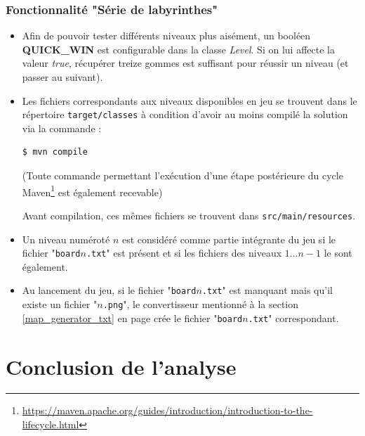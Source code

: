 \documentclass[12pt, openany]{report}
\begin{document}
\subsubsection{Fonctionnalité "Série de labyrinthes"}
\begin{itemize}
	\item Afin de pouvoir tester différents niveaux plus aisément, un booléen \mbox{\textbf{QUICK\_WIN}} est configurable dans la classe \mbox{\textit{Level}}.
	Si on lui affecte la valeur \textit{true}, récupérer treize gommes est suffisant pour réussir un niveau (et passer au suivant).
	\item Les fichiers correspondants aux niveaux disponibles en jeu se trouvent dans le répertoire \nolinkurl{target/classes} à condition d'avoir au moins \og compilé \fg la solution via la commande :
	\begin{lstlisting}[language=bash]
	$ mvn compile
	\end{lstlisting}
	(Toute commande permettant l'exécution d'une étape postérieure du cycle Maven\footnote{\url{https://maven.apache.org/guides/introduction/introduction-to-the-lifecycle.html}} est également recevable)
	
	Avant compilation, ces mêmes fichiers se trouvent dans \nolinkurl{src/main/resources}.
	\item Un niveau numéroté $n$ est considéré comme partie intégrante du jeu si le fichier "\nolinkurl{board}$n$\nolinkurl{.txt}" est présent et si les fichiers des niveaux $1...n-1$ le sont également.
	\item Au lancement du jeu, si le fichier "\nolinkurl{board}$n$\nolinkurl{.txt}" est manquant mais qu'il existe un fichier "$n$\nolinkurl{.png}", le convertisseur mentionné à la section \ref{map_generator_txt} en page \pageref{map_generator_txt} crée le fichier "\nolinkurl{board}$n$\nolinkurl{.txt}" correspondant.
\end{itemize}

\section{Conclusion de l'analyse}





%
%
\end{document}
